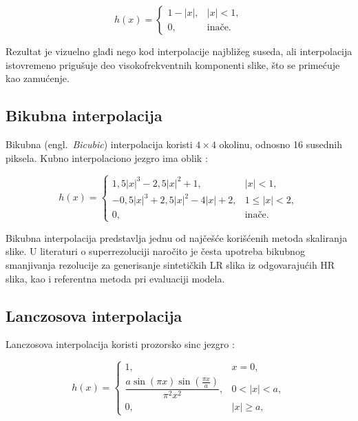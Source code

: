 \documentclass[12pt,a4paper]{article}
\begin{document}
\begin{equation}
	h(x) =
	\begin{cases}
		1 - |x|, & |x| < 1, \\
		0, & \text{inače.}
	\end{cases}
\end{equation}

Rezultat je vizuelno glađi nego kod interpolacije najbližeg suseda, ali interpolacija istovremeno prigušuje deo visokofrekventnih komponenti slike, što se primećuje kao zamućenje.

\subsection{Bikubna interpolacija}

Bikubna (engl.\ \textit{Bicubic}) interpolacija koristi $4 \times 4$ okolinu, odnosno 16 susednih piksela. Kubno interpolaciono jezgro ima oblik \cite{keys1981}:

\begin{equation}
	h(x) =
	\begin{cases}
		1{,}5|x|^3 - 2{,}5|x|^2 + 1, & |x| < 1, \\
		-0{,}5|x|^3 + 2{,}5|x|^2 - 4|x| + 2, & 1 \le |x| < 2, \\
		0, & \text{inače.}
	\end{cases}
\end{equation}

Bikubna interpolacija predstavlja jednu od najčešće korišćenih metoda skaliranja slike. U literaturi o superrezoluciji naročito je česta upotreba bikubnog smanjivanja rezolucije za generisanje sintetičkih LR slika iz odgovarajućih HR slika, kao i referentna metoda pri evaluaciji modela.

\subsection{Lanczosova interpolacija}

Lanczosova interpolacija koristi prozorsko sinc jezgro \cite{duchon1979}:

\begin{equation}
	h(x) =
	\begin{cases}
		1, & x = 0, \\[4pt]
		\dfrac{a \sin(\pi x)\sin(\frac{\pi x}{a})}
		{\pi^2x^2}, & 0 < |x| < a, \\[6pt]
		0, & |x| \ge a,
	\end{cases}
\end{equation}
\end{document}
